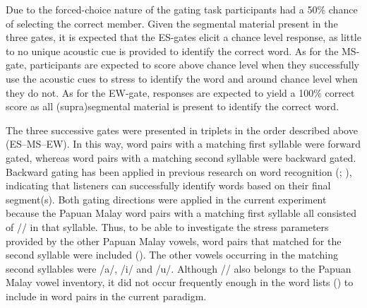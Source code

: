 Due to the forced-choice nature of the gating task participants had a 50\% chance of selecting the correct member. Given the segmental material present in the three gates, it is expected that the ES-gates elicit a chance level response, as little to no unique acoustic cue is provided to identify the correct word. As for the MS-gate, participants are expected to score above chance level when they successfully use the acoustic cues to stress to identify the word and around chance level when they do not. As for the EW-gate, responses are expected to yield a 100\% correct score as all (supra)segmental material is present to identify the correct word.\par

The three successive gates were presented in triplets in the order described above (ES–MS–EW). In this way, word pairs with a matching first syllable were forward gated, whereas word pairs with a matching second syllable were backward gated. Backward gating has been applied in previous research on word recognition (\citealt{salasoo_interaction_1985}; \citealt{wingfield_word_1997}), indicating that listeners can successfully identify words based on their final segment(s). Both gating directions were applied in the current experiment because the Papuan Malay word pairs with a matching first syllable all consisted of // in that syllable. Thus, to be able to investigate the stress parameters provided by the other Papuan Malay vowels, word pairs that matched for the second syllable were included (\citealt{kluge_grammar_2017}). The other vowels occurring in the matching second syllables were /a/, /i/ and /u/. Although // also belongs to the Papuan Malay vowel inventory, it did not occur frequently enough in the word lists (\citealt{kluge_grammar_2017}) to include in word pairs in the current paradigm. \par


